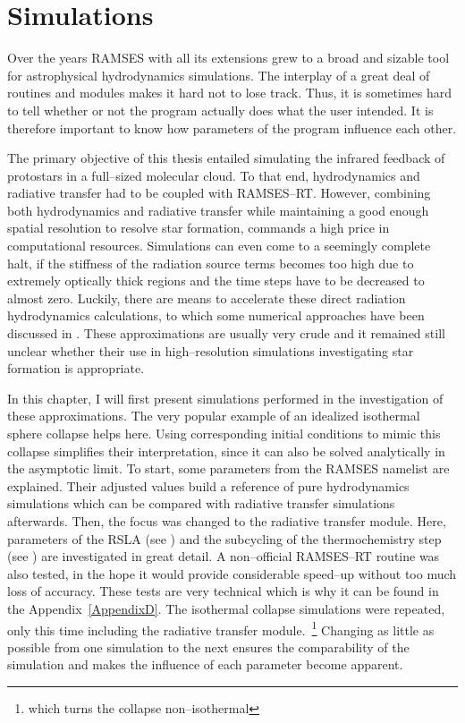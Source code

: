 \chapter{Simulations} %
\label{Chapter4} %

Over the years RAMSES with all its extensions grew to a broad and sizable tool for astrophysical hydrodynamics simulations.
The interplay of a great deal of routines and modules makes it hard not to lose track.
Thus, it is sometimes hard to tell whether or not the program actually does what the user intended.
It is therefore important to know how parameters of the program influence each other.

The primary objective of this thesis entailed simulating the infrared feedback of protostars in a full--sized molecular cloud.
To that end, hydrodynamics and radiative transfer had to be coupled with RAMSES--RT.
However, combining both hydrodynamics and radiative transfer while maintaining a good enough spatial resolution to resolve star formation, commands a high price in computational resources.
Simulations can even come to a seemingly complete halt, if the stiffness of the radiation source terms becomes too high due to extremely optically thick regions and the time steps have to be decreased to almost zero.
Luckily, there are means to accelerate these direct radiation hydrodynamics calculations, to which some numerical approaches have been discussed in .
These approximations are usually very crude and it remained still unclear whether their use in high--resolution simulations investigating star formation is appropriate.

In this chapter, I will first present simulations performed in the investigation of these approximations.
The very popular example of an idealized isothermal sphere collapse helps here.
Using corresponding initial conditions to mimic this collapse simplifies their interpretation, since it can also be solved analytically in the asymptotic limit.
To start, some parameters from the RAMSES namelist are explained.
Their adjusted values build a reference of pure hydrodynamics simulations which can be compared with radiative transfer simulations afterwards.
Then, the focus was changed to the radiative transfer module.
Here, parameters of the RSLA (see ) and the subcycling of the thermochemistry step (see ) are investigated in great detail.
A non--official RAMSES--RT routine was also tested, in the hope it would provide considerable speed--up without too much loss of accuracy.
These tests are very technical which is why it can be found in the Appendix~\ref{AppendixD}.
The isothermal collapse simulations were repeated, only this time including the radiative transfer module.~\footnote{which turns the collapse non--isothermal}
Changing as little as possible from one simulation to the next ensures the comparability of the simulation and makes the influence of each parameter become apparent.

